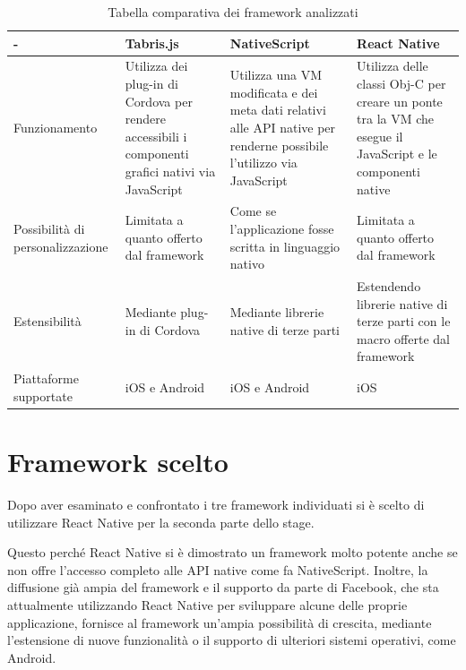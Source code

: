 \begin{table}[h]
\centering

\begin{tabular}{|m{2.3cm}|m{3cm}|m{3cm}|m{3cm}|}
\hline - & Tabris.js & NativeScript & React Native   \\ 
\hline  

Funzionamento & Utilizza dei plug-in di Cordova per rendere accessibili i componenti grafici nativi via JavaScript & Utilizza una VM modificata e dei meta dati relativi alle API native per renderne possibile l'utilizzo via JavaScript  & Utilizza delle classi Obj-C per creare un ponte tra la VM che esegue il JavaScript e le componenti native   \\ 

\hline  

 Possibilità di personalizzazione & Limitata a quanto offerto dal framework & Come se l'applicazione fosse scritta in linguaggio nativo & Limitata a quanto offerto dal framework   \\
 
\hline 

 Estensibilità & Mediante plug-in di Cordova & Mediante librerie native di terze parti & Estendendo librerie native di terze parti con le macro offerte dal framework  \\ 

\hline

 Piattaforme supportate & iOS e Android & iOS e Android & iOS   \\

\hline

\end{tabular}

\caption{Tabella comparativa dei framework analizzati}
\label{my-label}
\end{table}

\FloatBarrier
\section{Framework scelto}

Dopo aver esaminato e confrontato i tre framework individuati si è scelto di utilizzare React Native per la seconda parte dello stage.

Questo perché React Native si è dimostrato un framework molto potente anche se non offre l'accesso completo alle API native come fa NativeScript.
Inoltre, la diffusione già ampia del framework e il supporto da parte di Facebook, che sta attualmente utilizzando React Native per sviluppare alcune delle proprie applicazione, fornisce al framework un'ampia possibilità di crescita, mediante l'estensione di nuove funzionalità o il supporto di ulteriori sistemi operativi, come Android.

